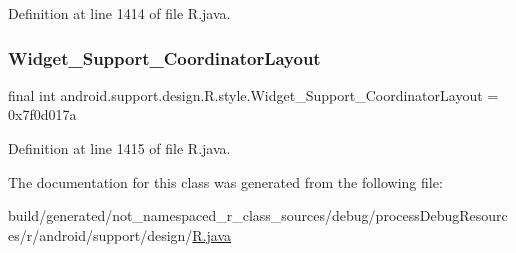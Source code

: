 Definition at line 1414 of file R.\+java.

\mbox{\label{classandroid_1_1support_1_1design_1_1_r_1_1style_a23cf73966d8f8c806022639b928ea871}} 
\subsubsection{\texorpdfstring{Widget\_Support\_CoordinatorLayout}{Widget\_Support\_CoordinatorLayout}}
{\footnotesize\ttfamily final int android.\+support.\+design.\+R.\+style.\+Widget\+\_\+\+Support\+\_\+\+Coordinator\+Layout = 0x7f0d017a\hspace{0.3cm}{\ttfamily [static]}}



Definition at line 1415 of file R.\+java.



The documentation for this class was generated from the following file\+:\begin{DoxyCompactItemize}
\item 
build/generated/not\+\_\+namespaced\+\_\+r\+\_\+class\+\_\+sources/debug/process\+Debug\+Resources/r/android/support/design/\mbox{\hyperlink{android_2support_2design_2_r_8java}{R.\+java}}\end{DoxyCompactItemize}
